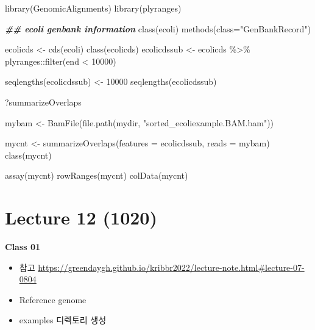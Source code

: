 \documentclass[
]{book}
\newenvironment{Shaded}{\begin{snugshade}}{\end{snugshade}}
\newcommand{\AttributeTok}[1]{\textcolor[rgb]{0.77,0.63,0.00}{#1}}
\newcommand{\DecValTok}[1]{\textcolor[rgb]{0.00,0.00,0.81}{#1}}
\newcommand{\DocumentationTok}[1]{\textcolor[rgb]{0.56,0.35,0.01}{\textbf{\textit{#1}}}}
\newcommand{\FunctionTok}[1]{\textcolor[rgb]{0.00,0.00,0.00}{#1}}
\newcommand{\NormalTok}[1]{#1}
\newcommand{\OtherTok}[1]{\textcolor[rgb]{0.56,0.35,0.01}{#1}}
\newcommand{\SpecialCharTok}[1]{\textcolor[rgb]{0.00,0.00,0.00}{#1}}
\newcommand{\StringTok}[1]{\textcolor[rgb]{0.31,0.60,0.02}{#1}}
\begin{document}
\begin{Shaded}
\begin{Highlighting}[]
\FunctionTok{library}\NormalTok{(GenomicAlignments)}
\FunctionTok{library}\NormalTok{(plyranges)}

\DocumentationTok{\#\# ecoli genbank information}
\FunctionTok{class}\NormalTok{(ecoli)}
\FunctionTok{methods}\NormalTok{(}\AttributeTok{class=}\StringTok{"GenBankRecord"}\NormalTok{)}

\NormalTok{ecolicds }\OtherTok{\textless{}{-}} \FunctionTok{cds}\NormalTok{(ecoli)}
\FunctionTok{class}\NormalTok{(ecolicds)}
\NormalTok{ecolicdssub }\OtherTok{\textless{}{-}}\NormalTok{ ecolicds }\SpecialCharTok{\%\textgreater{}\%} 
\NormalTok{  plyranges}\SpecialCharTok{::}\FunctionTok{filter}\NormalTok{(end }\SpecialCharTok{\textless{}} \DecValTok{10000}\NormalTok{)}

\FunctionTok{seqlengths}\NormalTok{(ecolicdssub) }\OtherTok{\textless{}{-}} \DecValTok{10000}
\FunctionTok{seqlengths}\NormalTok{(ecolicdssub)}


\NormalTok{?summarizeOverlaps}

\NormalTok{mybam }\OtherTok{\textless{}{-}} \FunctionTok{BamFile}\NormalTok{(}\FunctionTok{file.path}\NormalTok{(mydir, }\StringTok{"sorted\_ecoliexample.BAM.bam"}\NormalTok{))}

\NormalTok{mycnt }\OtherTok{\textless{}{-}} \FunctionTok{summarizeOverlaps}\NormalTok{(}\AttributeTok{features =}\NormalTok{ ecolicdssub,}
                  \AttributeTok{reads =}\NormalTok{ mybam)}
\FunctionTok{class}\NormalTok{(mycnt)}

\FunctionTok{assay}\NormalTok{(mycnt)}
\FunctionTok{rowRanges}\NormalTok{(mycnt)}
\FunctionTok{colData}\NormalTok{(mycnt)}
\end{Highlighting}
\end{Shaded}

\hypertarget{lecture-12-1020}{%
\section{Lecture 12 (1020)}\label{lecture-12-1020}}

\textbf{Class 01}

\begin{itemize}
\item
  참고 \url{https://greendaygh.github.io/kribbr2022/lecture-note.html\#lecture-07-0804}
\item
  Reference genome
\item
  examples 디렉토리 생성
\end{itemize}
\end{document}
